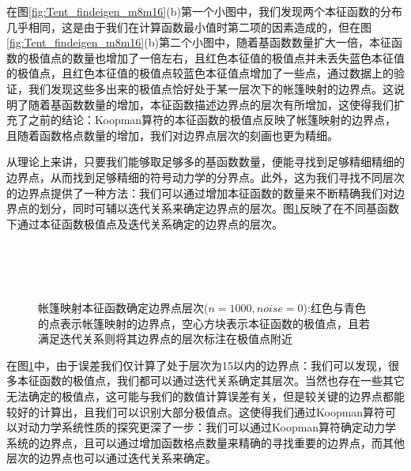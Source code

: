 在图\ref{fig:Tent_findeigen_m8m16}(b)第一个小图中，我们发现两个本征函数的分布几乎相同，这是由于我们在计算函数最小值时第二项的因素造成的，但在图\ref{fig:Tent_findeigen_m8m16}(b)第二个小图中，随着基函数数量扩大一倍，本征函数的极值点的数量也增加了一倍左右，且红色本征值的极值点并未丢失蓝色本征值的极值点，且红色本征值的极值点较蓝色本征值点增加了一些点，通过数据上的验证，我们发现这些多出来的极值点恰好处于某一层次下的帐篷映射的边界点。这说明了随着基函数数量的增加，本征函数描述边界点的层次有所增加，这使得我们扩充了之前的结论：Koopman算符的本征函数的极值点反映了帐篷映射的边界点，且随着函数格点数量的增加，我们对边界点层次的刻画也更为精细。

从理论上来讲，只要我们能够取足够多的基函数数量，便能寻找到足够精细精细的边界点，从而找到足够精细的符号动力学的分界点。此外，这为我们寻找不同层次的边界点提供了一种方法：我们可以通过增加本征函数的数量来不断精确我们对边界点的划分，同时可辅以迭代关系来确定边界点的层次。图\ref{fig:Tent_auto_level_n1000_m4}反映了在不同基函数下通过本征函数极值点及迭代关系确定的边界点的层次。

\begin{figure}[!]
  \centering
    \\
    \\
    \\
  \caption[帐篷映射本征函数确定边界点层次]{帐篷映射本征函数确定边界点层次($n=1000,noise=0$):红色与青色的点表示帐篷映射的边界点，空心方块表示本征函数的极值点，且若满足迭代关系则将其边界点的层次标注在极值点附近}\label{fig:Tent_auto_level_n1000_m4}
\end{figure}

在图\ref{fig:Tent_auto_level_n1000_m4}中，由于误差我们仅计算了处于层次为15以内的边界点：我们可以发现，很多本征函数的极值点，我们都可以通过迭代关系确定其层次。当然也存在一些其它无法确定的极值点，这可能与我们的数值计算误差有关，但是较关键的边界点都能较好的计算出，且我们可以识别大部分极值点。这使得我们通过Koopman算符可以对动力学系统性质的探究更深了一步：我们可以通过Koopman算符确定动力学系统的边界点，且可以通过增加函数格点数量来精确的寻找重要的边界点，而其他层次的边界点也可以通过迭代关系来确定。


